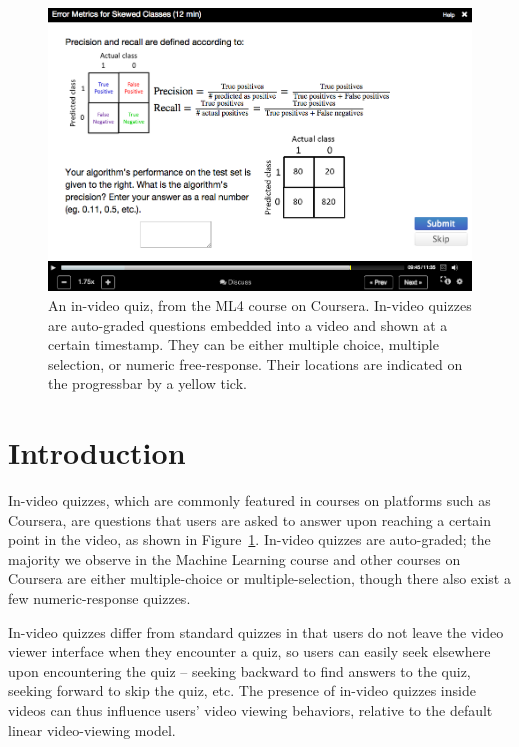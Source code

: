 \documentclass{sigchi}
\begin{document}


\begin{figure}
\includegraphics[width=1.0\columnwidth]{coursera}
\caption{An in-video quiz, from the ML4 course on Coursera. In-video quizzes are auto-graded questions embedded into a video and shown at a certain timestamp. They can be either multiple choice, multiple selection, or numeric free-response. Their locations are indicated on the progressbar by a yellow tick.}
\label{fig:coursera}
\end{figure}

\section{Introduction}

In-video quizzes, which are commonly featured in courses on platforms such as Coursera, are questions that users are asked to answer upon reaching a certain point in the video, as shown in Figure~\ref{fig:coursera}. In-video quizzes are auto-graded; the majority we observe in the Machine Learning course and other courses on Coursera are either multiple-choice or multiple-selection, though there also exist a few numeric-response quizzes.

In-video quizzes differ from standard quizzes in that users do not leave the video viewer interface when they encounter a quiz, so users can easily seek elsewhere upon encountering the quiz -- seeking backward to find answers to the quiz, seeking forward to skip the quiz, etc.
The presence of in-video quizzes inside videos can thus influence users' video viewing behaviors,
relative to the default linear video-viewing model.
\end{document}
